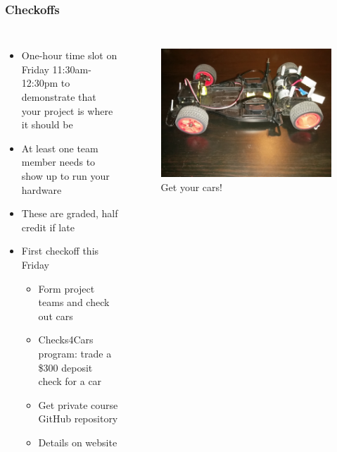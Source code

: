 \documentclass{beamer}
\begin{document}
\begin{frame}
\frametitle{Checkoffs}
\begin{columns}[t]
\begin{itemize}
  \item One-hour time slot on Friday 11:30am-12:30pm to demonstrate that your project is where it should be
  \item At least one team member needs to show up to run your hardware
  \item These are graded, half credit if late
  \newline
  \item First checkoff this Friday
  \begin{itemize}
    \item Form project teams and check out cars
    \item Checks4Cars program: trade a \$300 deposit check for a car
    \item Get private course GitHub repository
    \item Details on website
  \end{itemize}
\end{itemize}

\begin{figure}
\centering
\includegraphics[width=1.0\columnwidth]{images-dis1/car-chassis}
\newline
Get your cars!
\end{figure}
\end{columns}
\end{frame}
\end{document}
